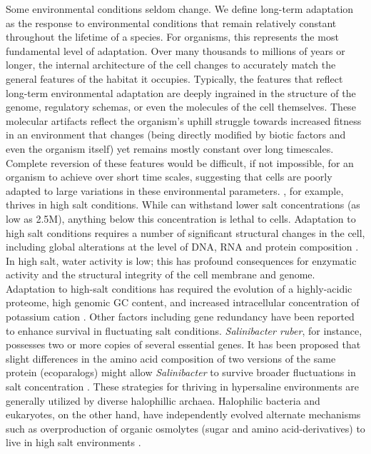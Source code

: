 Some environmental conditions seldom change. We define long-term adaptation as the response to environmental conditions that remain relatively constant throughout the lifetime of a species. For organisms, this represents the most fundamental level of adaptation. Over many thousands to millions of years or longer, the internal architecture of the cell changes to accurately match the general features of the habitat it occupies. Typically, the features that reflect long-term environmental adaptation are deeply ingrained in the structure of the genome, regulatory schemas, or even the molecules of the cell themselves. These molecular artifacts reflect the organism's uphill struggle towards increased fitness in an environment that changes (being directly modified by biotic factors and even the organism itself) yet remains mostly constant over long timescales. Complete reversion of these features would be difficult, if not impossible, for an organism to achieve over short time scales, suggesting that cells are poorly adapted to large variations in these environmental parameters. \halo, for example, thrives in high salt conditions. While \halo can withstand lower salt concentrations (as low as 2.5M), anything below this concentration is lethal to cells. Adaptation to high salt conditions requires a number of significant structural changes in the cell, including global alterations at the level of DNA, RNA and protein composition \cite{dassarma_post-genomics_2006}. In high salt, water activity is low; this has profound consequences for enzymatic activity and the structural integrity of the cell membrane and genome. Adaptation to high-salt conditions has required the evolution of a highly-acidic proteome, high genomic GC content, and increased intracellular concentration of potassium cation \cite{oren_microbial_2008}.  Other factors including gene redundancy have been reported to enhance survival in fluctuating salt conditions. \textit{Salinibacter ruber}, for instance, possesses two or more copies of several essential genes. It has been proposed that slight differences in the amino acid composition of two versions of the same protein (ecoparalogs) might allow \textit{Salinibacter} to survive broader fluctuations in salt concentration \cite{sanchez-perez_adapting_2008}.  These strategies for thriving in hypersaline environments are generally utilized by diverse halophillic archaea.  Halophilic bacteria and eukaryotes, on the other hand, have independently evolved alternate mechanisms such as overproduction of organic osmolytes (sugar and amino acid-derivatives) to live in high salt environments \cite{oren_microbial_2008}.
 
